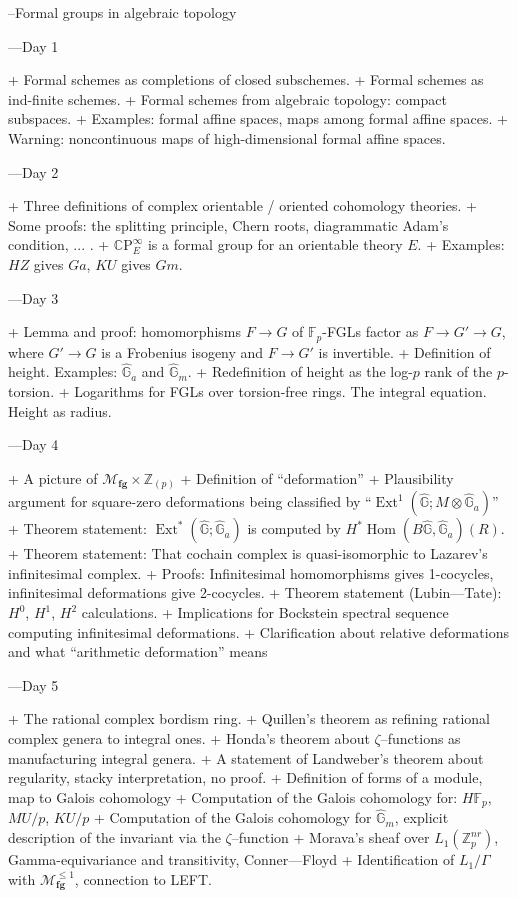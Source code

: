 \documentclass[12pt]{book}
\newcommand{\Z}{\mathbb Z}
\newcommand{\F}{\mathbb F}
\newcommand{\G}{\widehat{\mathbb G}}
\newcommand{\C}{\mathbb{C}}
\newcommand{\CP}{\C\mathrm P}
\newcommand{\<}{\langle}
\renewcommand{\>}{\rangle}
\newcommand{\moduli}[1]{\mathcal{M}_{\mathbf{#1}}}
\DeclareMathOperator{\Ext}{Ext}
\numberwithin{equation}{section}
\theoremstyle{plain}
\theoremstyle{definition}
\theoremstyle{remark}
\begin{document}
--Formal groups in algebraic topology

---Day 1

+ Formal schemes as completions of closed subschemes.
+ Formal schemes as ind-finite schemes.
+ Formal schemes from algebraic topology: compact subspaces.
+ Examples: formal affine spaces, maps among formal affine spaces.
+ Warning: noncontinuous maps of high-dimensional formal affine spaces.

---Day 2

+ Three definitions of complex orientable / oriented cohomology theories.
+ Some proofs: the splitting principle, Chern roots, diagrammatic Adam's condition, ... .
+ $\CP^\infty_E$ is a formal group for an orientable theory $E$.
+ Examples: $HZ$ gives $Ga$, $KU$ gives $Gm$.

---Day 3

+ Lemma and proof: homomorphisms $F \to G$ of $\F_p$-FGLs factor as $F \to G' \to G$, where $G' \to G$ is a Frobenius isogeny and $F \to G'$ is invertible.
+ Definition of height.  Examples: $\G_a$ and $\G_m$.
+ Redefinition of height as the log-$p$ rank of the $p$-torsion.
+ Logarithms for FGLs over torsion-free rings.  The integral equation.  Height as radius.

---Day 4

+ A picture of $\moduli{fg} \times \Z_{(p)}$
+ Definition of ``deformation''
+ Plausibility argument for square-zero deformations being classified by ``$\Ext^1(\G; M \otimes \G_a)$''
+ Theorem statement: $\Ext^*(\G; \G_a)$ is computed by $H^* \operatorname{Hom}(B\G, \G_a)(R)$.
+ Theorem statement: That cochain complex is quasi-isomorphic to Lazarev's infinitesimal complex.
+ Proofs: Infinitesimal homomorphisms gives 1-cocycles, infinitesimal deformations give 2-cocycles.
+ Theorem statement (Lubin—Tate): $H^0$, $H^1$, $H^2$ calculations.
+ Implications for Bockstein spectral sequence computing infinitesimal deformations.
+ Clarification about relative deformations and what ``arithmetic deformation'' means

---Day 5

+ The rational complex bordism ring.
+ Quillen’s theorem as refining rational complex genera to integral ones.
+ Honda’s theorem about $\zeta$--functions as manufacturing integral genera.
+ A statement of Landweber's theorem about regularity, stacky interpretation, no proof.
+ Definition of forms of a module, map to Galois cohomology
+ Computation of the Galois cohomology for: $H\F_p$, $MU/p$, $KU/p$
+ Computation of the Galois cohomology for $\G_m$, explicit description of the invariant via the $\zeta$--function
+ Morava’s sheaf over $L_1(\Z_p^{nr})$, Gamma-equivariance and transitivity, Conner—Floyd
+ Identification of $L_1 / \Gamma$ with $\moduli{fg}^{\le 1}$, connection to LEFT.
\end{document}
